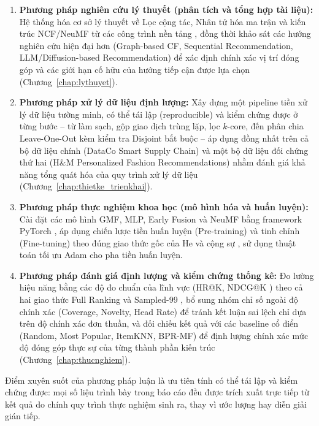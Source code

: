 \begin{enumerate}
    \item \textbf{Phương pháp nghiên cứu lý thuyết (phân tích và tổng hợp tài liệu):} Hệ thống hóa cơ sở lý thuyết về Lọc cộng tác, Nhân tử hóa ma trận và kiến trúc NCF/NeuMF từ các công trình nền tảng \parencite{koren2009matrix, he2017ncf}, đồng thời khảo sát các hướng nghiên cứu hiện đại hơn (Graph-based CF, Sequential Recommendation, LLM/Diffusion-based Recommendation) để xác định chính xác vị trí đóng góp và các giới hạn cố hữu của hướng tiếp cận được lựa chọn (Chương~\ref{chap:lythuyet}).
    \item \textbf{Phương pháp xử lý dữ liệu định lượng:} Xây dựng một pipeline tiền xử lý dữ liệu tường minh, có thể tái lập (reproducible) và kiểm chứng được ở từng bước -- từ làm sạch, gộp giao dịch trùng lặp, lọc $k$-core, đến phân chia Leave-One-Out kèm kiểm tra Disjoint bắt buộc -- áp dụng đồng nhất trên cả bộ dữ liệu chính (DataCo Smart Supply Chain) và một bộ dữ liệu đối chứng thứ hai (H\&M Personalized Fashion Recommendations) nhằm đánh giá khả năng tổng quát hóa của quy trình xử lý dữ liệu (Chương~\ref{chap:thietke_trienkhai}).
    \item \textbf{Phương pháp thực nghiệm khoa học (mô hình hóa và huấn luyện):} Cài đặt các mô hình GMF, MLP, Early Fusion và NeuMF bằng framework PyTorch \parencite{paszke2019pytorch}, áp dụng chiến lược tiền huấn luyện (Pre-training) và tinh chỉnh (Fine-tuning) theo đúng giao thức gốc của He và cộng sự \parencite{he2017ncf}, sử dụng thuật toán tối ưu Adam \parencite{kingma2014adam} cho pha tiền huấn luyện.
    \item \textbf{Phương pháp đánh giá định lượng và kiểm chứng thống kê:} Đo lường hiệu năng bằng các độ đo chuẩn của lĩnh vực (HR@K, NDCG@K \parencite{jarvelin2002}) theo cả hai giao thức Full Ranking và Sampled-99 \parencite{krichene2020sampled}, bổ sung nhóm chỉ số ngoài độ chính xác (Coverage, Novelty, Head Rate) để tránh kết luận sai lệch chỉ dựa trên độ chính xác đơn thuần, và đối chiếu kết quả với các baseline cổ điển (Random, Most Popular, ItemKNN, BPR-MF) để định lượng chính xác mức độ đóng góp thực sự của từng thành phần kiến trúc (Chương~\ref{chap:thucnghiem}).
\end{enumerate}

Điểm xuyên suốt của phương pháp luận là ưu tiên tính có thể tái lập và kiểm chứng được: mọi số liệu trình bày trong báo cáo đều được trích xuất trực tiếp từ kết quả do chính quy trình thực nghiệm sinh ra, thay vì ước lượng hay diễn giải gián tiếp.

